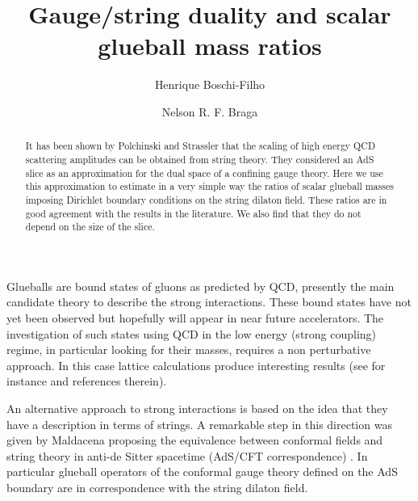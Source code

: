 \documentclass[a4paper,twocolumn,prl,groupedaddress,nofootinbib,showpacs]{revtex4}
\begin{document}
\title{Gauge/string duality and scalar glueball mass ratios}


\author{Henrique Boschi-Filho}
\author{Nelson R. F. Braga}

 
\begin{abstract} 
 
It has been shown by Polchinski and Strassler that the scaling of 
high energy QCD scattering amplitudes can be obtained from  
string theory. They considered an AdS slice as an 
approximation for the dual space of a confining gauge theory. 
Here we use this approximation to estimate in a very simple way 
the ratios of scalar glueball masses imposing Dirichlet boundary 
conditions on the string dilaton field. 
These ratios are in good agreement with the results in the literature.
We also find that they do not depend on the size of the slice. 

\end{abstract}



\maketitle



Glueballs are bound states of gluons as predicted by QCD,  
presently the main candidate theory to describe the strong 
interactions.
These bound states have not yet been observed but hopefully 
will appear in near future accelerators. The investigation of such 
states using QCD in the low energy (strong coupling) regime, 
in particular looking for their masses,  
requires a non perturbative approach.
In this case lattice calculations produce 
interesting results (see for instance\cite{LAT1,LAT2} 
and references therein).

An alternative approach to strong interactions is based on the
idea that they have a description in terms of strings\cite{Planar,Pol}. 
A remarkable step in this direction was given by Maldacena\cite{Malda} 
proposing the equivalence between conformal fields  and string
theory in anti-de Sitter spacetime (AdS/CFT correspondence)
\cite{GKP,Wi,Malda2}.
In particular glueball operators of the conformal gauge theory defined on 
the AdS boundary are in correspondence with the string dilaton field.
  
\end{document}
